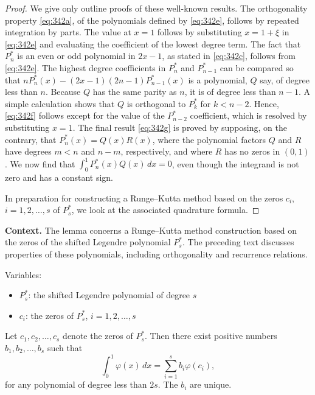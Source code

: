 \begin{proof}
We give only outline proofs of these well-known results. The orthogonality property \eqref{eq:342a}, of the polynomials defined by \eqref{eq:342e}, follows by repeated integration by parts. The value at \(x = 1\) follows by substituting \(x = 1 + \xi\) in \eqref{eq:342e} and evaluating the coefficient of the lowest degree term. The fact that \(P_n^*\) is an even or odd polynomial in \(2x - 1\), as stated in \eqref{eq:342c}, follows from \eqref{eq:342e}. The highest degree coefficients in \(P_n^*\) and \(P_{n-1}^*\) can be compared so that \(n P_n^*(x) - (2x - 1)(2n - 1) P_{n-1}^*(x)\) is a polynomial, \(Q\) say, of degree less than \(n\). Because \(Q\) has the same parity as \(n\), it is of degree less than \(n - 1\). A simple calculation shows that \(Q\) is orthogonal to \(P_k^*\) for \(k < n - 2\). Hence, \eqref{eq:342f} follows except for the value of the \(P_{n-2}^*\) coefficient, which is resolved by substituting \(x = 1\). The final result \eqref{eq:342g} is proved by supposing, on the contrary, that \(P_n^*(x) = Q(x) R(x)\), where the polynomial factors \(Q\) and \(R\) have degrees \(m < n\) and \(n - m\), respectively, and where \(R\) has no zeros in \((0, 1)\). We now find that \(\int_0^1 P_n^*(x) Q(x) \, dx = 0\), even though the integrand is not zero and has a constant sign.

In preparation for constructing a Runge--Kutta method based on the zeros \(c_i\), \(i = 1, 2, \dots, s\) of \(P_s^*\), we look at the associated quadrature formula.
\end{proof}

\noindent\textbf{Context.}
The lemma concerns a Runge--Kutta method construction based on the zeros of the shifted Legendre polynomial $P_s^*$. The preceding text discusses properties of these polynomials, including orthogonality and recurrence relations.

Variables:
\begin{itemize}
    \item $P_s^*$: the shifted Legendre polynomial of degree $s$
    \item $c_i$: the zeros of $P_s^*$, $i = 1, 2, \dots, s$
\end{itemize}

\begin{lemma}

  \label{lem:342B}
Let \(c_{1}, c_{2}, \dots, c_{s}\) denote the zeros of \(P_{s}^{*}\). Then there exist positive numbers \(b_{1}, b_{2}, \dots, b_{s}\) such that
\[
\int_{0}^{1} \varphi(x) \, dx = \sum_{i=1}^{s} b_{i} \varphi(c_{i}), \tag{342h}
\]
for any polynomial of degree less than \(2s\). The \(b_{i}\) are unique.
\end{lemma}

